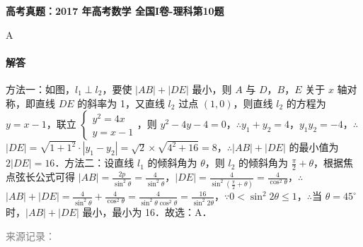 \documentclass[UTF8,a4paper,11pt]{ctexart}
\newenvironment{gaokao}[1]{\par\medskip\noindent\textbf{高考真题：#1}\par\smallskip}{\par\medskip}
\begin{document}
\begin{gaokao}{2017 年高考数学 全国I卷-理科第10题}
A

\paragraph{解答}

方法一：如图，$l_1\perp l_2$，要使 $|AB|+|DE|$ 最小，则 $A$ 与 $D$，$B$，$E$ 关于 $x$ 轴对称，即直线 $DE$ 的斜率为 1，又直线 $l_2$ 过点 $(1,0)$，则直线 $l_2$ 的方程为 $y=x-1$，联立 $\begin{cases} y^2=4x \\ y=x-1 \end{cases}$，则 $y^2-4y-4=0$，\ensuremath{\therefore}$y_1+y_2=4$，$y_1y_2=-4$，\ensuremath{\therefore}$|DE|=\sqrt{1+1^2}\cdot|y_1-y_2|=\sqrt{2}\times\sqrt{4^2+16}=8$，\ensuremath{\therefore}$|AB|+|DE|$ 的最小值为 $2|DE|=16$．方法二：设直线 $l_1$ 的倾斜角为 $\theta$，则 $l_2$ 的倾斜角为 $\frac{\pi}{2}+\theta$，根据焦点弦长公式可得 $|AB|=\frac{2p}{\sin^2\theta}=\frac{4}{\sin^2\theta}$，$|DE|=\frac{4}{\sin^2(\frac{\pi}{2}+\theta)}=\frac{4}{\cos^2\theta}$，\ensuremath{\therefore}$|AB|+|DE|=\frac{4}{\sin^2\theta}+\frac{4}{\cos^2\theta}=\frac{4}{\sin^2\theta\cos^2\theta}=\frac{16}{\sin^2 2\theta}$，\ensuremath{\because}$0<\sin^2 2\theta\leq 1$，\ensuremath{\therefore}当 $\theta=45^\circ$ 时，$|AB|+|DE|$ 最小，最小为 16．故选：A．

\par\smallskip\textcolor{gray}{\footnotesize 来源记录：\texttt{}}

\end{gaokao}
\end{document}
